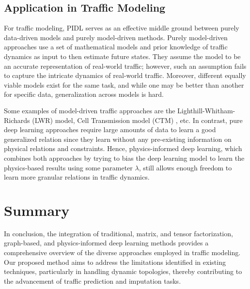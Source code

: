 \subsection{Application in Traffic Modeling}
For traffic modeling, PIDL serves as an effective middle ground between purely data-driven models and purely model-driven methods. Purely model-driven approaches use a set of mathematical models and prior knowledge of traffic dynamics as input to then estimate future states. They assume the model to be an accurate representation of real-world traffic; however, such an assumption fails to capture the intricate dynamics of real-world traffic. Moreover, different equally viable models exist for the same task, and while one may be better than another for specific data, generalization across models is hard.

Some examples of model-driven traffic approaches are the Lighthill-Whitham-Richards (LWR) \cite{lwr} model, Cell Transmission model (CTM) \cite{ctm}, etc. In contrast, pure deep learning approaches require large amounts of data to learn a good generalized relation since they learn without any pre-existing information on physical relations and constraints. Hence, physics-informed deep learning, which combines both approaches by trying to bias the deep learning model to learn the physics-based results using some parameter $\lambda$, still allows enough freedom to learn more granular relations in traffic dynamics.

\section{Summary}
In conclusion, the integration of traditional, matrix, and tensor factorization, graph-based, and physics-informed deep learning methods provides a comprehensive overview of the diverse approaches employed in traffic modeling. Our proposed method aims to address the limitations identified in existing techniques, particularly in handling dynamic topologies, thereby contributing to the advancement of traffic prediction and imputation tasks.
